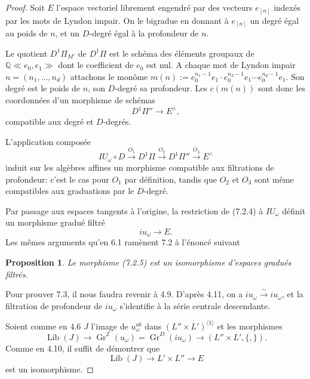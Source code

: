 \documentclass[11pt,a4paper]{article}
\theoremstyle{plain}
\newtheorem{proposition}[theorem]{Proposition}
\theoremstyle{definition}
\DeclareMathOperator{\Lib}{Lib}
\newcommand{\Q}{\mathbb{Q}}
\newcommand{\Z}{\mathbb{Z}}
\newcommand{\Gr}{\operatorname{Gr}}
\begin{document}
\begin{proof}
Soit $E$ l'espace vectoriel librement engendr\'e par des vecteurs $e_{[n]}$ index\'es par les mots de Lyndon impair. On le bigradue en donnant \`a $e_{[n]}$ un degr\'e \'egal au poids de $n$, et un $D$-degr\'e \'egal \`a la profondeur de $n$.

Le quotient $D^1\Pi_{M'}$ de $D^1\Pi$ est le sch\'ema des \'el\'ements groupaux de $\Q \ll e_0, e_1 \gg$ dont le coefficient de $e_0$ est nul. A chaque mot de Lyndon impair $n = (n_1,\ldots,n_d)$ attachons le mon\^ome $m(n) := e_0^{n_1-1}e_1 \cdot e_0^{n_2-1}e_1 \cdots e_0^{n_d-1}e_1$. Son degr\'e est le poids de $n$, son $D$-degr\'e sa profondeur. Les $c(m(n))$ sont donc les coordonn\'ees d'un morphisme de sch\'emas
\begin{equation}\label{eq:7.2.3}
D^1\Pi'' \to E^{\wedge},
\end{equation}
compatible aux degr\'e et $D$-degr\'es.

L'application compos\'ee
\begin{equation}\label{eq:7.2.4}
IU_\omega \circ D \xrightarrow{O_1} D^1\Pi \xrightarrow{O_2} D^1\Pi'' \xrightarrow{O_3} E^{\wedge}
\end{equation}
induit sur les alg\`ebres affines un morphisme compatible aux filtrations de profondeur: c'est le cas pour $O_1$ par d\'efinition, tandis que $O_2$ et $O_3$ sont m\^eme compatibles aux graduations par le $D$-degr\'e.

Par passage aux espaces tangents \`a l'origine, la restriction de (7.2.4) \`a $IU_\omega$ d\'efinit un morphisme gradu\'e filtr\'e
\begin{equation}\label{eq:7.2.5}
iu_\omega \to E.
\end{equation}
Les m\^emes arguments qu'en 6.1 ram\`enent 7.2 \`a l'\'enonc\'e suivant

\begin{proposition}\label{prop:7.3}
Le morphisme (7.2.5) est un isomorphisme d'espaces gradu\'es filtr\'es.
\end{proposition}

Pour prouver 7.3, il nous faudra revenir \`a 4.9. D'apr\`es 4.11, on a $iu_\omega \xrightarrow{\sim} iu_\omega$, et la filtration de profondeur de $iu_\omega$ s'identifie \`a la s\'erie centrale descendante.

Soient comme en 4.6 $J$ l'image de $u_\omega^{ab}$ dans $(L'' \times L')^{\langle 1 \rangle}$ et les morphismes
\begin{equation}\label{eq:7.3.1}
\Lib(J) \to \Gr^\Z(u_\omega) = \Gr^D(iu_\omega) \to (L'' \times L', \{,\}).
\end{equation}
Comme en 4.10, il suffit de d\'emontrer que
\begin{equation}\label{eq:7.3.2}
\Lib(J) \to L' \times L'' \to E
\end{equation}
est un isomorphisme.


\end{proof}
\end{document}
